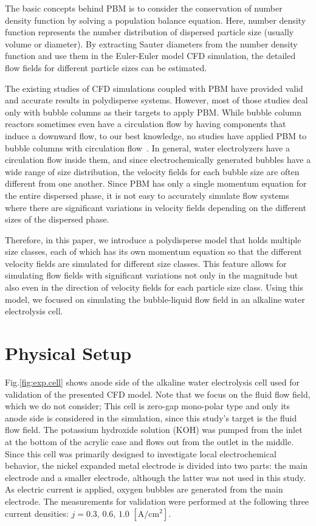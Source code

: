 \documentclass[3p, twocolumn, 10pt]{elsarticle}
\begin{document}
The basic concepts behind PBM is to consider the conservation of number density function by solving a population balance equation.
Here, number density function represents the number distribution of dispersed particle size (usually volume or diameter).
By extracting Sauter diameters from the number density function and use them in the Euler-Euler model CFD simulation, the detailed flow fields for different particle sizes can be estimated.

The existing studies of CFD simulations coupled with PBM have provided valid and accurate results in polydisperse systems.
However, most of those studies deal only with bubble columns as their targets to apply PBM.
While bubble column reactors sometimes even have a circulation flow by having components that induce a downward flow, to our best knowledge, no studies have applied PBM to bubble columns with circulation flow~\cite{chenCFDModelingBubble2004,bholeCFDSimulationBubble2008,sanyalComparisonPopulationBalance2004,liuCultivationAerobicGranules2007}.
In general, water electrolyzers have a circulation flow inside them, and since electrochemically generated bubbles have a wide range of size distribution, the velocity fields for each bubble size are often different from one another.
Since PBM has only a single momentum equation for the entire dispersed phase, it is not easy to accurately simulate flow systems where there are significant variations in velocity fields depending on the different sizes of the dispersed phase.

Therefore, in this paper, we introduce a polydisperse model that holds multiple size classes, each of which has its own momentum equation so that the different velocity fields are simulated for different size classes.
This feature allows for simulating flow fields with significant variations not only in the magnitude but also even in the direction of velocity fields for each particle size class.
Using this model, we focused on simulating the bubble-liquid flow field in an alkaline water electrolysis cell.

\section{Physical Setup}
Fig.\ref{fig:exp.cell} shows anode side of the alkaline water electrolysis cell used for validation of the presented 
CFD model. Note that we focus on the fluid flow field, which we do not consider; This cell is zero-gap mono-polar 
type and only its anode side is considered in the simulation, since this study's target is the fluid flow field. 
The potassium hydroxide solution (KOH) was pumped from the inlet at the bottom of the acrylic case and flows out 
from the outlet in the middle. Since this cell was primarily designed to investigate local electrochemical behavior, 
the nickel expanded metal electrode is divided into two parts: the main electrode and a smaller electrode, although 
the latter was not used in this study. As electric current is applied, oxygen bubbles are generated from the main 
electrode. The measurements for validation were performed at the following three current densities: 
$j=0.3$, $0.6$, $1.0$ $[\mathrm{A/cm^2}]$.
\end{document}

